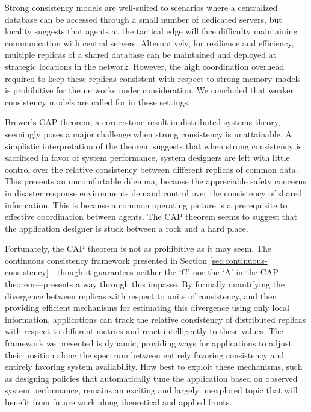 \documentclass[]             %
{NASA}                       %
\theoremstyle{definition}
\begin{document}
Strong consistency models are well-suited to scenarios where a
centralized database can be accessed through a small number of
dedicated servers, but locality suggests that agents at the tactical
edge will face difficulty maintaining communication with central
servers. Alternatively, for resilience and efficiency, multiple
replicas of a shared database can be maintained and deployed at
strategic locations in the network. However, the high coordination
overhead required to keep these replicas consistent with respect to
strong memory models is prohibitive for the networks under
consideration. We concluded that weaker consistency models are called
for in these settings.

Brewer's CAP theorem, a cornerstone result in distributed systems
theory, seemingly poses a major challenge when strong consistency is
unattainable. A simplistic interpretation of the theorem suggests that
when strong consistency is sacrificed in favor of system performance,
system designers are left with little control over the relative
consistency between different replicas of common data. This presents
an uncomfortable dilemma, because the appreciable safety concerns in
disaster response environments demand control over the consistency of
shared information. This is because a common operating picture is a
prerequisite to effective coordination between agents. The CAP theorem
seems to suggest that the application designer is stuck between a rock
and a hard place.

Fortunately, the CAP theorem is not as prohibitive as it may seem. The
continuous consistency framework presented in Section
\ref{sec:continuous-consistency}---though it guarantees neither the
`C' nor the `A' in the CAP theorem---presents a way through this
impasse. By formally quantifying the divergence between replicas with
respect to units of consistency, and then providing efficient
mechanisms for estimating this divergence using only local
information, applications can track the relative consistency of
distributed replicas with respect to different metrics and react
intelligently to these values. The framework we presented is dynamic,
providing ways for applications to adjust their position along the
spectrum between entirely favoring consistency and entirely favoring
system availability. How best to exploit these mechanisms, such as
designing policies that automatically tune the application based on
observed system performance, remains an exciting and largely
unexplored topic that will benefit from future work along theoretical
and applied fronts.
\end{document}
